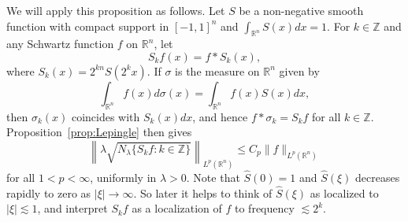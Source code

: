 \documentclass[12pt,leqno]{amsart}
\def\R{\mathbb{R}}
\def\Z{\mathbb{Z}}
\theoremstyle{plain}
\numberwithin{equation}{section}
\begin{document}
We will apply this proposition as follows. Let $S$ be a non-negative smooth function with compact support in $[-1,1]^n$ and $\int_{\R^n} S(x) dx = 1$. 
For $k \in \Z$ and any Schwartz function $f$ on $\R^n$, let 
\[S_k f(x) = f*S_k(x),\]
where $S_k(x)= 2^{kn} S(2^k x)$.
If $\sigma$ is the measure on $\R^n$ given by 
\[
\int_{\R^n} f(x) d\sigma(x) = \int_{\R^n} f(x) S(x) dx,
\]
then $\sigma_k(x)$ coincides with $S_k(x) dx$, and hence $f * \sigma_k = S_k f$ for all $k \in \Z$. Proposition~\ref{prop:Lepingle} then gives
\begin{equation} \label{eq:Sk_jump}
\left\| \lambda \sqrt{N_{\lambda}\{ S_k f \colon k \in \Z \}} \right\|_{L^p(\R^n)} \leq C_p \|f\|_{L^p(\R^n)} 
\end{equation}
for all $1 < p < \infty$, uniformly in $\lambda > 0$.  Note that $\widehat{S}(0) = 1$ and $\widehat{S}(\xi)$ decreases rapidly to zero as $|\xi| \to \infty$. So later it helps to think of $\widehat{S}(\xi)$ as localized to $|\xi| \lesssim 1$, and interpret $S_k f$ as a localization of $f$ to frequency $\lesssim 2^k$.\\
\end{document}
